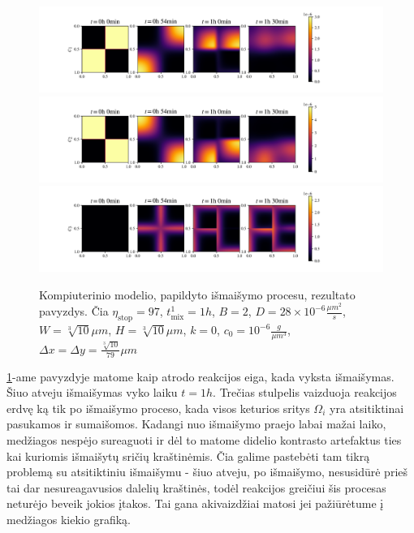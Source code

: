 \begin{figure}[h!]
\centering
\caption{Kompiuterinio modelio, papildyto išmaišymo procesu, rezultato pavyzdys. Čia $\eta_\text{stop} = 97$, $t^1_\text{mix} = 1h$, $B = 2$, $D = 28\times 10^{-6} \frac{\mu m^2}{s}$, $W = \sqrt[3]{10}\mu m$, $H = \sqrt[3]{10}\mu m$, $k = 0$, $c_0 = 10^{-6} \frac{g}{\mu m^3}$, $\Delta x = \Delta y = \frac{\sqrt[3]{10}}{79} \mu m$ }
\includegraphics[width=\textwidth]{../paper/assets/random-mix-example-c0-1.png} \\
\includegraphics[width=\textwidth]{../paper/assets/random-mix-example-c1-1.png} \\
\includegraphics[width=\textwidth]{../paper/assets/random-mix-example-c2-1.png}
\label{mix-example}
\end{figure}

\ref{mix-example}-ame pavyzdyje matome kaip atrodo reakcijos eiga, kada vyksta išmaišymas. Šiuo atveju išmaišymas vyko laiku $t=1h$. Trečias stulpelis vaizduoja reakcijos erdvę ką tik po išmaišymo proceso, kada visos keturios sritys $\Omega_i$ yra atsitiktinai pasukamos ir sumaišomos. Kadangi nuo išmaišymo praejo labai mažai laiko, medžiagos nespėjo sureaguoti ir dėl to matome didelio kontrasto artefaktus ties kai kuriomis išmaišytų sričių kraštinėmis. Čia galime pastebėti tam tikrą problemą su atsitiktiniu išmaišymu - šiuo atveju, po išmaišymo, nesusidūrė prieš tai dar nesureagavusios dalelių kraštinės, todėl reakcijos greičiui šis procesas neturėjo beveik jokios įtakos. Tai gana akivaizdžiai matosi jei pažiūrėtume į medžiagos kiekio grafiką.


